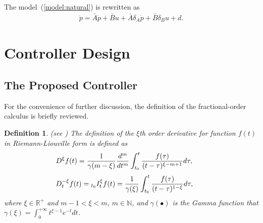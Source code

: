 \documentclass{ifacconf}
\newtheorem{mydef}{Definition}
\newtheorem{myproperty}{Property}
\begin{document}
The model~(\ref{model:natural}) is rewritten as
\begin{align} \label{model:final}
    \ddot{p}=\bar{A} \dot{p}+ \bar{B} u +\bar{A} \delta_A  \dot{p} + \bar{B}\delta_B u+d.
\end{align}

\section{Controller Design} \label{sec: controller design}

\subsection{The Proposed Controller}

For the convenience of further discussion, the definition of the fractional-order calculus is briefly reviewed.

\begin{mydef} (see \cite{podlubny1998fractional}) \label{def: fractional-order calculus}
  The definition of the $\xi$th order derivative for function $f(t)$ in Riemann-Liouville form is defined as
  \begin{equation}\begin{aligned}
\hspace*{-2em}D^{\xi}f(t)=\frac{1}{\gamma (m-\xi)}\frac{d^m}{dt^m}\int^t_{t_0}\frac{f(\tau)}{(t-\tau)^{\xi-m+1}}d\tau,
  \end{aligned}\end{equation}
  \begin{equation}\begin{aligned}
  \hspace*{-2em}  D^{-\xi}_{t}f(t)={}_{t_0}I^{\xi}_{t}f(t)=\frac{1}{\gamma (\xi)}\int^t_{t_0}\frac{f(\tau)}{(t-\tau)^{1-\xi}}d\tau,
  \end{aligned}\end{equation}
  where $\xi \in \mathbb{R}^+$ and $m-1<\xi<m$, $m\in \mathbb{N}$, and $\gamma (\bullet)$ is the Gamma function that $\gamma(\xi)=\int_0^{+\infty}t^{\xi-1}e^{-t}dt$. 
\end{mydef}

\end{document}
